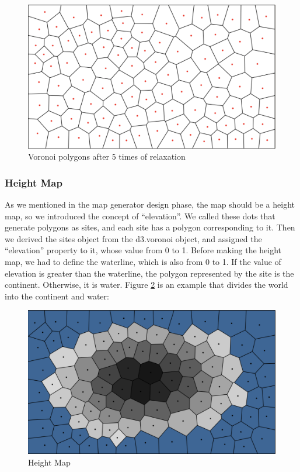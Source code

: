 \begin{figure}[htbp]
\centering
\includegraphics[width=\textwidth]{section04/assets/Map-voronoi-relaxation.png}
\caption[Voronoi polygons after 5 times of relaxation]{\label{fig:Voronoi relaxed polygons}Voronoi polygons after 5 times of relaxation}
\end{figure}

\subsubsection{Height Map}
As we mentioned in the map generator design phase, the map should be a height map, so we introduced the concept of ``elevation''. We called these dots that generate polygons as sites, and each site has a polygon corresponding to it. Then we derived the sites object from the d3.voronoi object, and assigned the ``elevation'' property to it, whose value from 0 to 1. Before making the height map, we had to define the waterline, which is also from 0 to 1. If the value of elevation is greater than the waterline, the polygon represented by the site is the continent. Otherwise, it is water. Figure \ref{fig:Height Map} is an example that divides the world into the continent and water:

\begin{figure}[htbp]
\centering
\includegraphics[width=\textwidth]{section04/assets/Map-heightmap.png}
\caption[Height Map]{\label{fig:Height Map}Height Map}
\end{figure}
